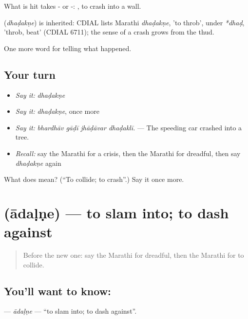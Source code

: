 What is hit takes - or -:  , to crash into a wall.

\begin{cousinweb}
\textbf{} (\emph{dhaḍakṇe}) is inherited: CDIAL lists Marathi \emph{dhaḍakṇe}, 'to throb', under \emph{*dhaḍ}, 'throb, beat' (CDIAL 6711); the sense of a crash grows from the thud.
\end{cousinweb}

\begin{grammarlens}[title={What you've built}]
One more word for telling what happened.
\end{grammarlens}

\subsection*{Your turn}
\begin{itemize}
\raggedright
  \item \emph{Say it:} \emph{dhaḍakṇe}
  \item \emph{Say it:} \emph{dhaḍakṇe}, once more
  \item \emph{Say it:} \emph{bhardhāv gāḍī jhāḍāvar dhaḍaklī.} — The speeding car crashed into a tree.
  \item \emph{Recall:} say the Marathi for a crisis, then the Marathi for dreadful, then say \emph{dhaḍakṇe} again
\end{itemize}

\begin{tcolorbox}[breakable,colback=teal!4,colframe=teal!35!black,title={Before you move on}]
What does  mean? (\textquotedblleft{}To collide; to crash\textquotedblright{}.) Say it once more.
\end{tcolorbox}
\section[\texorpdfstring{\mr{आदळणे} (ādaḷṇe)}{आदळणे (ādaḷṇe)}]{ (ādaḷṇe) — to slam into; to dash against}

\label{lesson:MR-C296-adalne}



\begin{quote}
Before the new one: say the Marathi for dreadful, then the Marathi for to collide.
\end{quote}

\subsection*{You'll want to know: }
\textbf{} — \emph{ādaḷṇe} — \textquotedblleft{}to slam into; to dash against\textquotedblright{}.

